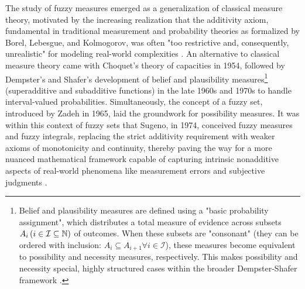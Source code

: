 









The study of fuzzy measures emerged as a generalization of classical measure theory, motivated by the increasing realization that the additivity axiom, fundamental in traditional measurement and probability theories as formalized by Borel, Lebesgue, and Kolmogorov, was often "too restrictive and, consequently, unrealistic" for modeling real-world complexities \cite[p.~10]{FuzzyMeasureHistory}. An alternative to classical measure theory came with Choquet's theory of capacities in 1954, followed by Dempster's and Shafer's development of belief and plausibility measures\footnote{Belief and plausibility measures are defined using a "basic probability assignment", which distributes a total measure of evidence across subsets $A_i \,(i\in \mathcal{I}\subseteq \mathbb{N})$ of outcomes. When these subsets are "consonant" (they can be ordered with inclusion: $A_i \subseteq  A_{i+1}\forall i\in \mathcal{I}$), these measures become equivalent to possibility and necessity measures, respectively. This makes possibility and necessity special, highly structured cases within the broader Dempster-Shafer framework \cite[Thm.~3.23, Thm.~3.25]{FuzzyMeasureHistory}.} (superadditive and subadditive functions) in the late 1960s and 1970s to handle interval-valued probabilities. Simultaneously, the concept of a fuzzy set, introduced by Zadeh in 1965, laid the groundwork for possibility measures. It was within this context of fuzzy sets that Sugeno, in 1974, conceived fuzzy measures and fuzzy integrals, replacing the strict additivity requirement with weaker axioms of monotonicity and continuity, thereby paving the way for a more nuanced mathematical framework capable of capturing intrinsic nonadditive aspects of real-world phenomena like measurement errors and subjective judgments \cite[p.~13]{FuzzyMeasureHistory}.\\

